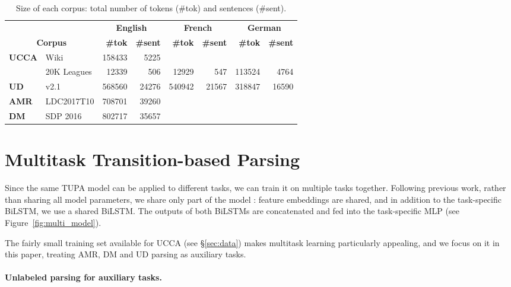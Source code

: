 \documentclass[11pt,a4paper]{article}
\begin{document}
\begin{table*}[ht]
\centering
\begin{tabular}{ll|rr|rr|rr}
& & \multicolumn{2}{c|}{\footnotesize \bf English} & \multicolumn{2}{c|}{\footnotesize \bf French} & \multicolumn{2}{c}{\footnotesize \bf German} \\
\multicolumn{2}{c|}{\footnotesize \bf Corpus} & \footnotesize \bf {\#}tok & \footnotesize \bf {\#}sent & \footnotesize \bf {\#}tok & \footnotesize \bf {\#}sent & \footnotesize \bf {\#}tok & \footnotesize \bf {\#}sent \\
\hline
\textbf{UCCA}
& Wiki & 158433 & 5225 &&&& \\
& 20K Leagues & 12339 & 506 & 12929 & 547 & 113524 & 4764 \\
\hline
\textbf{UD} & v2.1 & 568560 & 24276 & 540942 & 21567 & 318847 & 16590 \\
\hline
\textbf{AMR} & LDC2017T10 & 708701 & 39260 \\
\hline
\textbf{DM} & SDP 2016 & 802717 & 35657 \\
\end{tabular}
\caption{Size of each corpus: total number of tokens ({\#}tok) and sentences
({\#}sent).\label{tab:corpora}}
\end{table*}


\section{Multitask Transition-based Parsing}\label{sec:multitask}

Since the same TUPA model can be applied to different tasks, 
we can train it on multiple tasks together.
Following previous work, rather than sharing all model parameters, we share only part of the model
\cite{N16-1179,P16-2038,C16-1013,C16-1059,C16-1179,E17-1005,P17-1186}:
feature embeddings are shared, and in addition to the task-specific BiLSTM,
we use a shared BiLSTM. The outputs of both BiLSTMs are concatenated and
fed into the task-specific MLP (see Figure~\ref{fig:multi_model}).

The fairly small training set available for UCCA (see \S\ref{sec:data})
makes multitask learning particularly appealing,
and we focus on it in this paper, treating AMR, DM and UD parsing as auxiliary tasks.

\paragraph{Unlabeled parsing for auxiliary tasks.}
\end{document}
